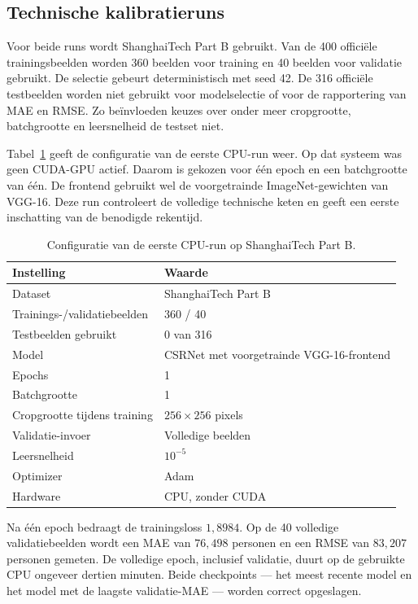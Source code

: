 \subsection{Technische kalibratieruns}

Voor beide runs wordt ShanghaiTech Part B gebruikt. Van de 400 officiële trainingsbeelden worden 360 beelden voor training en 40 beelden voor validatie gebruikt. De selectie gebeurt deterministisch met seed 42. De 316 officiële testbeelden worden niet gebruikt voor modelselectie of voor de rapportering van MAE en RMSE. Zo beïnvloeden keuzes over onder meer cropgrootte, batchgrootte en leersnelheid de testset niet.

Tabel~\ref{tab:eerste-csrnet-run} geeft de configuratie van de eerste CPU-run weer. Op dat systeem was geen CUDA-GPU actief. Daarom is gekozen voor één epoch en een batchgrootte van één. De frontend gebruikt wel de voorgetrainde ImageNet-gewichten van VGG-16. Deze run controleert de volledige technische keten en geeft een eerste inschatting van de benodigde rekentijd.

\begin{table}[htbp]
    \centering
    \begin{tabular}{ll}
        \toprule
        Instelling & Waarde \\
        \midrule
        Dataset & ShanghaiTech Part B \\
        Trainings-/validatiebeelden & 360 / 40 \\
        Testbeelden gebruikt & 0 van 316 \\
        Model & CSRNet met voorgetrainde VGG-16-frontend \\
        Epochs & 1 \\
        Batchgrootte & 1 \\
        Cropgrootte tijdens training & \(256 \times 256\) pixels \\
        Validatie-invoer & Volledige beelden \\
        Leersnelheid & \(10^{-5}\) \\
        Optimizer & Adam \\
        Hardware & CPU, zonder CUDA \\
        \bottomrule
    \end{tabular}
\caption[Configuratie van de eerste CSRNet-run]{Configuratie van de eerste CPU-run op ShanghaiTech Part B.}
    \label{tab:eerste-csrnet-run}
\end{table}

Na één epoch bedraagt de trainingsloss \(1{,}8984\). Op de 40 volledige validatiebeelden wordt een MAE van \(76{,}498\) personen en een RMSE van \(83{,}207\) personen gemeten. De volledige epoch, inclusief validatie, duurt op de gebruikte CPU ongeveer dertien minuten. Beide checkpoints --- het meest recente model en het model met de laagste validatie-MAE --- worden correct opgeslagen.

